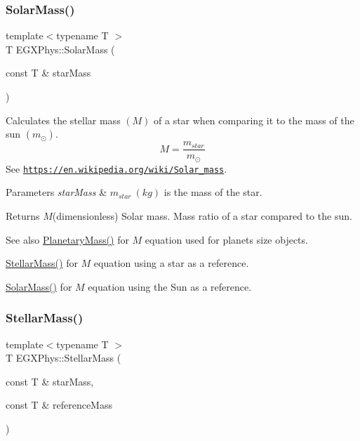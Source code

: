 \subsubsection{\texorpdfstring{Solar\+Mass()}{SolarMass()}}
{\footnotesize\ttfamily template$<$typename T $>$ \\
T E\+G\+X\+Phys\+::\+Solar\+Mass (\begin{DoxyParamCaption}\item[{const T \&}]{star\+Mass }\end{DoxyParamCaption})}



Calculates the stellar mass $(M)$ of a star when comparing it to the mass of the sun $(m_\odot)$. \[M=\frac{m_{star}}{m_\odot}\] See \href{https://en.wikipedia.org/wiki/Solar_mass}{\tt https\+://en.\+wikipedia.\+org/wiki/\+Solar\+\_\+mass}. 


\begin{DoxyParams}{Parameters}
{\em star\+Mass} & $m_{star}\ (kg)$ is the mass of the star. \\
\hline
\end{DoxyParams}
\begin{DoxyReturn}{Returns}
$M$(dimensionless) Solar mass. Mass ratio of a star compared to the sun. 
\end{DoxyReturn}
\begin{DoxySeeAlso}{See also}
\mbox{\hyperlink{group___planetary_mass_ga225bcf56fb37468f6d4d46493d403503}{Planetary\+Mass()}} for $M$ equation used for planets size objects. 

\mbox{\hyperlink{group___stellar_mass_gabbd6081cd3bfb0153d7470d58f733a61}{Stellar\+Mass()}} for $M$ equation using a star as a reference. 

\mbox{\hyperlink{group___stellar_mass_gac393d64d586be3dc76ac7a98ac336514}{Solar\+Mass()}} for $M$ equation using the Sun as a reference. 
\end{DoxySeeAlso}
\mbox{\label{group___stellar_mass_gabbd6081cd3bfb0153d7470d58f733a61}} 
\subsubsection{\texorpdfstring{Stellar\+Mass()}{StellarMass()}}
{\footnotesize\ttfamily template$<$typename T $>$ \\
T E\+G\+X\+Phys\+::\+Stellar\+Mass (\begin{DoxyParamCaption}\item[{const T \&}]{star\+Mass,  }\item[{const T \&}]{reference\+Mass }\end{DoxyParamCaption})}



